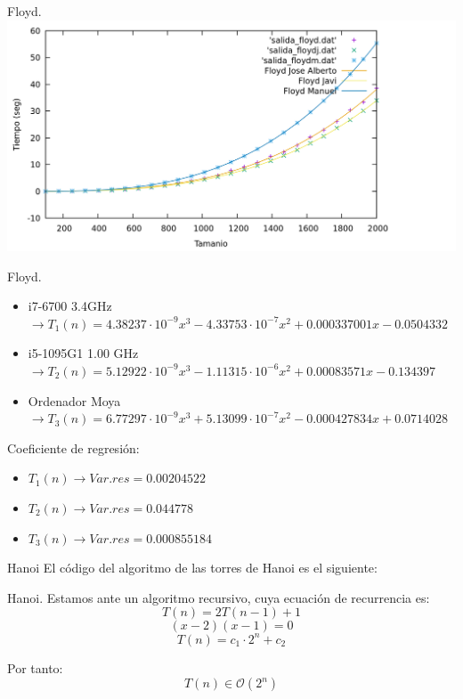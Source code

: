\documentclass[10pt, xcolor=table]{beamer}
\begin{document}
\begin{frame}{Floyd.
}
\centering
\includegraphics[scale=0.15]{../../Images/floyd_combinados.png}
\end{frame}

\begin{frame}{Floyd.
}
\begin{itemize}
	\item i7-6700 3.4GHz \(\rightarrow T_1(n) = 4.38237 \cdot 10^{-9} x^3 - 4.33753 \cdot 10^{-7} x^2 + 0.000337001x - 0.0504332\)
	\item i5-1095G1 1.00 GHz \(\rightarrow T_2(n) = 5.12922 \cdot 10^{-9} x^3 - 1.11315 \cdot 10^{-6} x^2 + 0.00083571x - 0.134397\)
	\item Ordenador Moya \(\rightarrow T_3(n) = 6.77297 \cdot 10^{-9} x^3 + 5.13099 \cdot 10^{-7} x^2 - 0.000427834 x + 0.0714028\)
\end{itemize}

Coeficiente de regresión:
\begin{itemize}
	\item \(T_1 (n) \longrightarrow Var.res = 0.00204522\)
	\item \(T_2 (n) \longrightarrow Var.res = 0.044778\)
	\item \(T_3 (n) \longrightarrow Var.res = 0.000855184\)
\end{itemize}
\end{frame}

\begin{frame}{Hanoi}
El código del algoritmo de las torres de Hanoi es el siguiente:

\end{frame}

\begin{frame}[fragile]{Hanoi.
}
Estamos ante un algoritmo recursivo, cuya ecuación de recurrencia es:
\[
	T(n) = 2 T(n-1) +1
\]
\[
	(x-2)(x-1) = 0
\]
\[
	T(n) = c_1 \cdot 2^n + c_2
\]

Por tanto:
\[
	T(n) \in \mathcal{O}(2^n)
\]
\end{frame}
\end{document}
